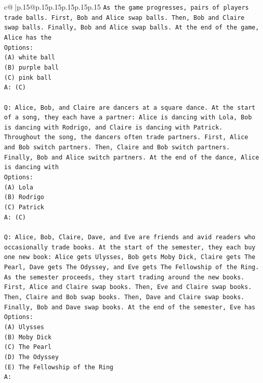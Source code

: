 \documentclass{article}
\begin{document}
{\begin{supertabular}{c@{$\;$}|p{.15\linewidth}@{}p{.15\linewidth}p{.15\linewidth}p{.15\linewidth}p{.15\linewidth}p{.15\linewidth}}
{{{\texttt{As the game progresses, pairs of players trade balls. First, Bob and Alice swap balls. Then, Bob and Claire swap balls. Finally, Bob and Alice swap balls. At the end of the game, Alice has the} \\
\texttt{Options:} \\
\texttt{(A) white ball} \\
\texttt{(B) purple ball} \\
\texttt{(C) pink ball} \\
\texttt{A: (C)} \\
\\ 
\texttt{Q: Alice, Bob, and Claire are dancers at a square dance. At the start of a song, they each have a partner: Alice is dancing with Lola, Bob is dancing with Rodrigo, and Claire is dancing with Patrick.} \\
\texttt{Throughout the song, the dancers often trade partners. First, Alice and Bob switch partners. Then, Claire and Bob switch partners. Finally, Bob and Alice switch partners. At the end of the dance, Alice is dancing with} \\
\texttt{Options:} \\
\texttt{(A) Lola} \\
\texttt{(B) Rodrigo} \\
\texttt{(C) Patrick} \\
\texttt{A: (C)} \\
\\ 
\texttt{Q: Alice, Bob, Claire, Dave, and Eve are friends and avid readers who occasionally trade books. At the start of the semester, they each buy one new book: Alice gets Ulysses, Bob gets Moby Dick, Claire gets The Pearl, Dave gets The Odyssey, and Eve gets The Fellowship of the Ring.} \\
\texttt{As the semester proceeds, they start trading around the new books. First, Alice and Claire swap books. Then, Eve and Claire swap books. Then, Claire and Bob swap books. Then, Dave and Claire swap books. Finally, Bob and Dave swap books. At the end of the semester, Eve has} \\
\texttt{Options:} \\
\texttt{(A) Ulysses} \\
\texttt{(B) Moby Dick} \\
\texttt{(C) The Pearl} \\
\texttt{(D) The Odyssey} \\
\texttt{(E) The Fellowship of the Ring} \\
\texttt{A:} \\
            }
        }
    }
     \\ \\


\end{supertabular}}
\end{document}
